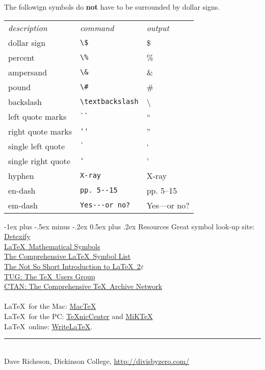 \documentclass[10pt]{article}
\makeatletter
\renewcommand{\section}{\@startsection{section}{1}{0mm}%
                                {-1ex plus -.5ex minus -.2ex}%
                                {0.5ex plus .2ex}%
                                {\normalfont\large\bfseries}}
\makeatother
\begin{document}
\begin{multicols}{1}
The followign symbols do \textbf{not} have to be surrounded by dollar signs.

\begin{tabular}{lll}
\emph{description} & \emph{command} & \emph{output}\\
dollar sign & \verb!\$! & \$ \\
percent & \verb!\%! & \% \\
ampersand & \verb!\&! & \& \\
pound & \verb!\#! & \# \\
backslash & \verb!\textbackslash! & \textbackslash \\
left quote marks & \verb!``! & `` \\
right quote marks & \verb!''! & '' \\
single left quote  & \verb!`! & ` \\
single right quote  & \verb!'! & ' \\
hyphen & \verb!X-ray! & X-ray\\
en-dash & \verb!pp. 5--15! & pp. 5--15 \\
em-dash & \verb!Yes---or no?! & Yes---or no? 
\end{tabular}

\section{Resources}
Great symbol look-up site: \href{http://detexify.kirelabs.org/}{Detexify}\\
\href{http://amath.colorado.edu/documentation/LaTeX/Symbols.pdf}{\LaTeX\ Mathematical Symbols}\\
\href{ftp://tug.ctan.org/pub/tex-archive/info/symbols/comprehensive/symbols-letter.pdf}{The Comprehensive \LaTeX\ Symbol List}\\ 
\href{http://mirrors.med.harvard.edu/ctan/info/lshort/english/lshort.pdf}{The Not So Short Introduction to \LaTeX\ 2$\varepsilon$}\\
\href{http://www.tug.org/}{TUG: The \TeX\ Users Group}\\
\href{http://www.ctan.org/}{CTAN: The Comprehensive \TeX\ Archive Network}\\
~\\
\LaTeX\ for the Mac: \href{http://www.tug.org/mactex/}{Mac\TeX}\\
\LaTeX\ for the PC: \href{http://www.texniccenter.org/}{{\TeX}nicCenter} and \href{http://miktex.org/}{MiK\TeX}\\
\LaTeX\ online: \href{http://www.writelatex.com/}{WriteLaTeX}.
\vfill
\hrule
~\\
Dave Richeson, Dickinson College, \href{http://divisbyzero.com/}{http://divisbyzero.com/}
\end{multicols}
\end{document}
